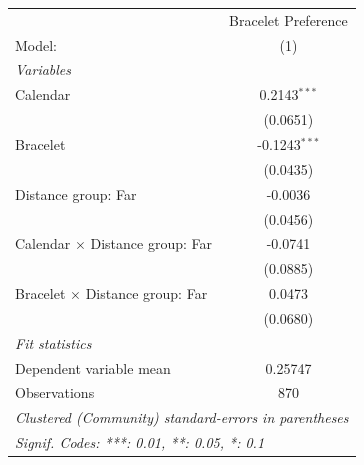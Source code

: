 
\begingroup
\centering
\begin{tabular}{lc}
   \tabularnewline \midrule \midrule
                                          & Bracelet  Preference \\   
   Model:                                 & (1)\\  
   \midrule
   \emph{Variables}\\
   Calendar                               & 0.2143$^{***}$\\   
                                          & (0.0651)\\   
   Bracelet                               & -0.1243$^{***}$\\   
                                          & (0.0435)\\   
   Distance group: Far                    & -0.0036\\   
                                          & (0.0456)\\   
   Calendar $\times$ Distance group: Far  & -0.0741\\   
                                          & (0.0885)\\   
   Bracelet $\times$ Distance group: Far  & 0.0473\\   
                                          & (0.0680)\\   
   \midrule
   \emph{Fit statistics}\\
   Dependent variable mean                & 0.25747\\  
   Observations                           & 870\\  
   \midrule \midrule
   \multicolumn{2}{l}{\emph{Clustered (Community) standard-errors in parentheses}}\\
   \multicolumn{2}{l}{\emph{Signif. Codes: ***: 0.01, **: 0.05, *: 0.1}}\\
\end{tabular}
\par\endgroup


